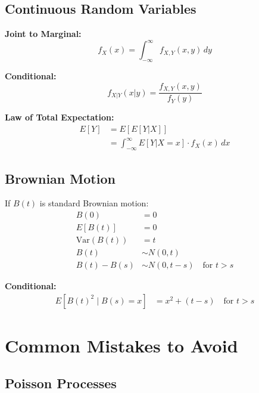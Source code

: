 \documentclass[11pt,letterpaper]{article}
\begin{document}
\subsection{Continuous Random Variables}

\begin{tcolorbox}[colback=blue!5,colframe=blue!70,title=Joint \& Conditional Density Formulas]
\textbf{Joint to Marginal:}
\[
f_X(x) = \int_{-\infty}^{\infty} f_{X,Y}(x,y) \, dy
\]

\textbf{Conditional:}
\[
f_{X|Y}(x|y) = \frac{f_{X,Y}(x,y)}{f_Y(y)}
\]

\textbf{Law of Total Expectation:}
\begin{align*}
E[Y] &= E[E[Y|X]] \\
&= \int_{-\infty}^{\infty} E[Y|X=x] \cdot f_X(x) \, dx
\end{align*}
\end{tcolorbox}

\subsection{Brownian Motion}

\begin{tcolorbox}[colback=blue!5,colframe=blue!70,title=Brownian Motion Formulas]
If $B(t)$ is standard Brownian motion:
\begin{align*}
B(0) &= 0 \\
E[B(t)] &= 0 \\
\text{Var}(B(t)) &= t \\
B(t) &\sim N(0,t) \\
B(t) - B(s) &\sim N(0, t-s) \quad \text{for } t > s
\end{align*}

\textbf{Conditional:}
\begin{align*}
E[B(t)^2 \mid B(s) = x] &= x^2 + (t-s) \quad \text{for } t > s
\end{align*}
\end{tcolorbox}

\newpage

\section{Common Mistakes to Avoid}

\subsection{Poisson Processes}
\end{document}
